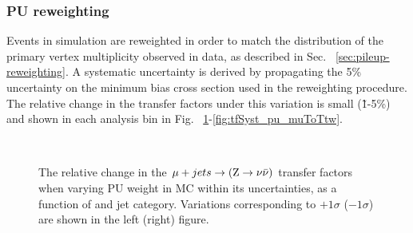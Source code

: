 \subsubsection*{PU reweighting}
\label{sec:tfSyst_pu}

Events in simulation are reweighted in order to match the distribution 
of the primary vertex multiplicity observed in data, as described in Sec. ~\ref{sec:pileup-reweighting}.
A systematic uncertainty is derived by propagating 
the 5\% uncertainty on the minimum bias cross section used in the reweighting procedure. 
The relative change in the transfer factors under this variation is
small (\~1-5\%)
and shown in each analysis bin in Fig. ~\ref{fig:tfSyst_pu_muToZinv}-\ref{fig:tfSyst_pu_muToTtw}.

\begin{figure}[!h]
  \centering
   ~~
  \\

  \caption{\label{fig:tfSyst_pu_muToZinv} The relative change in the
  $\mu + jets \rightarrow ({\text Z} \rightarrow \nu\bar{\nu})$ transfer
  factors when varying PU weight in MC within its uncertainties, as a function of \scalht and jet category. 
  Variations corresponding to $+1\sigma$ ($-1\sigma$) are shown in the left (right) figure. 
  }
\end{figure}

